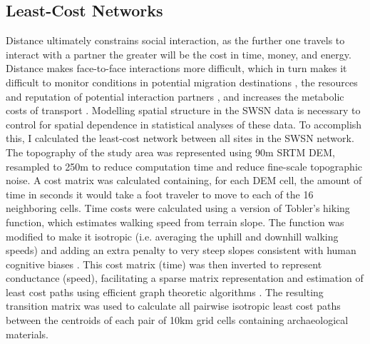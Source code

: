\documentclass[10pt]{iopart}
\begin{document}
\subsection*{Least-Cost Networks}
Distance ultimately constrains social interaction, as the further one travels to interact with a partner the greater will be the cost in time, money, and energy. Distance makes face-to-face interactions more difficult, which in turn makes it difficult to monitor conditions in potential migration destinations \parencite{Anderies2011a}, the resources and reputation of potential interaction partners \parencite{Fafchamps2007}, and increases the metabolic costs of transport \parencite{Drennan1984}. Modelling spatial structure in the SWSN data is necessary to control for spatial dependence in statistical analyses of these data. To accomplish this, I calculated the least-cost network between all sites in the SWSN network. The topography of the study area was represented using 90m SRTM DEM, resampled to 250m to reduce computation time and reduce fine-scale topographic noise. A cost matrix was calculated containing, for each DEM cell, the amount of time in seconds it would take a foot traveler to move to each of the 16 neighboring cells. Time costs were calculated using a version of Tobler's hiking function, which estimates walking speed from terrain slope. The function was modified to make it isotropic (i.e. averaging the uphill and downhill walking speeds) and adding an extra penalty to very steep slopes consistent with human cognitive biases \parencite{Pingel2010}. This cost matrix (time) was then inverted to represent conductance (speed), facilitating a sparse matrix representation and estimation of least cost paths using efficient graph theoretic algorithms \parencite{Etten2014}. The resulting transition matrix was used to calculate all pairwise isotropic least cost paths between the centroids of each pair of 10km grid cells containing archaeological materials. 
\end{document}
